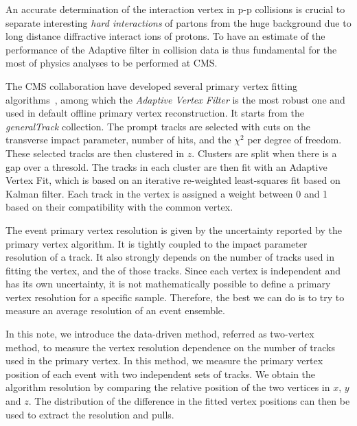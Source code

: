 
An accurate determination of the interaction vertex in p-p collisions is crucial
to separate interesting \emph{hard interactions} of partons from the 
huge background due to long distance diffractive interact ions of protons. 
 To have an estimate of the performance of the Adaptive filter in collision data 
is thus fundamental for the most of physics analyses to be performed at CMS. 

The CMS collaboration have developed several primary vertex fitting algorithms~\cite{pvtxreco}, 
among which the \emph{Adaptive Vertex Filter} is the most robust one and 
used in default offline primary vertex reconstruction. 
It starts from the \emph{generalTrack} collection. 
The prompt tracks are selected with cuts on the transverse impact parameter, 
number of hits, and the $\chi^2$ per degree of freedom. 
These selected tracks are then clustered in $z$. Clusters are
split when there is a gap over a thresold. The tracks in each
cluster are then fit with an Adaptive Vertex Fit, which is 
based on an iterative re-weighted least-squares fit based on Kalman filter. 
Each track in the vertex is assigned a weight between 0 and 1
based on their compatibility with the common vertex.

The event primary vertex resolution is given by the uncertainty 
reported by the primary vertex algorithm. 
It is tightly coupled to the impact parameter resolution of a track. 
It also strongly depends on the number of tracks used in fitting the vertex,
and the \pt of those tracks. 
Since each vertex is independent and has its own uncertainty, it is not 
mathematically possible to define a primary vertex resolution for a specific sample.
Therefore, the best we can do is to try to measure an average 
resolution of an event ensemble.

In this note, we introduce the data-driven method, referred as two-vertex 
method, to measure the vertex resolution dependence on the 
number of tracks used in the primary vertex. 
In this method, we measure the primary vertex position of each event 
with two independent sets of tracks. 
We obtain the algorithm resolution by comparing the 
relative position of the two vertices in $x$, $y$ and $z$. 
The distribution of the difference in the fitted vertex positions 
can then be used to extract the resolution and pulls. 

